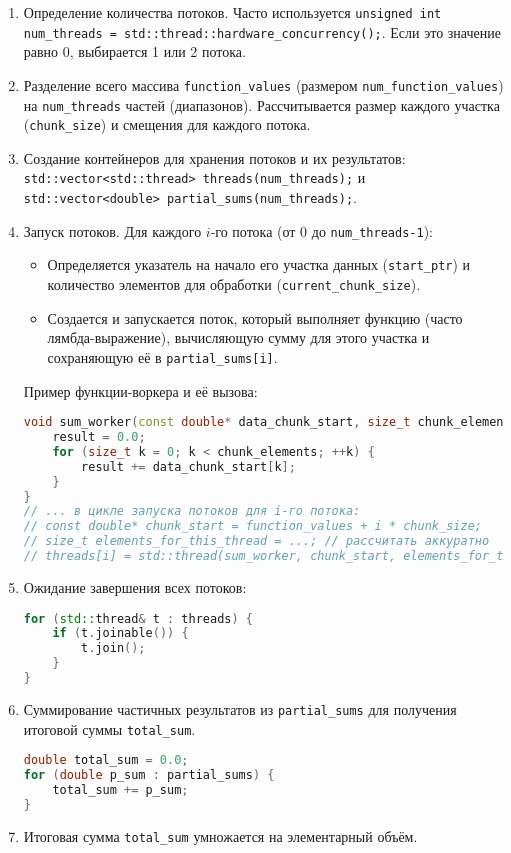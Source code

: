 \documentclass[12pt]{article}
\begin{document}
\begin{enumerate}
    \item Определение количества потоков. Часто используется \texttt{unsigned int num\_threads = std::thread::hardware\_concurrency();}. Если это значение равно 0, выбирается 1 или 2 потока.
    \item Разделение всего массива \texttt{function\_values} (размером \texttt{num\_function\_values}) на \texttt{num\_threads} частей (диапазонов). Рассчитывается размер каждого участка (\texttt{chunk\_size}) и смещения для каждого потока.
    \item Создание контейнеров для хранения потоков и их результатов: \texttt{std::vector<std::thread> threads(num\_threads);} и \texttt{std::vector<double> partial\_sums(num\_threads);}.
    \item Запуск потоков. Для каждого $i$-го потока (от 0 до \texttt{num\_threads-1}):
        \begin{itemize}
            \item Определяется указатель на начало его участка данных (\texttt{start\_ptr}) и количество элементов для обработки (\texttt{current\_chunk\_size}).
            \item Создается и запускается поток, который выполняет функцию (часто лямбда-выражение), вычисляющую сумму для этого участка и сохраняющую её в \texttt{partial\_sums[i]}.
        \end{itemize}
    Пример функции-воркера и её вызова:
\begin{lstlisting}[language=C++, basicstyle=\small\ttfamily, frame=none, numbers=none]
void sum_worker(const double* data_chunk_start, size_t chunk_elements, double& result) {
    result = 0.0;
    for (size_t k = 0; k < chunk_elements; ++k) {
        result += data_chunk_start[k];
    }
}
// ... в цикле запуска потоков для i-го потока:
// const double* chunk_start = function_values + i * chunk_size;
// size_t elements_for_this_thread = ...; // рассчитать аккуратно
// threads[i] = std::thread(sum_worker, chunk_start, elements_for_this_thread, std::ref(partial_sums[i]));
\end{lstlisting}
    \item Ожидание завершения всех потоков:
\begin{lstlisting}[language=C++, basicstyle=\small\ttfamily, frame=none, numbers=none]
for (std::thread& t : threads) {
    if (t.joinable()) {
        t.join();
    }
}
\end{lstlisting}
    \item Суммирование частичных результатов из \texttt{partial\_sums} для получения итоговой суммы \texttt{total\_sum}.
\begin{lstlisting}[language=C++, basicstyle=\small\ttfamily, frame=none, numbers=none]
double total_sum = 0.0;
for (double p_sum : partial_sums) {
    total_sum += p_sum;
}
\end{lstlisting}
    \item Итоговая сумма \texttt{total\_sum} умножается на элементарный объём.
\end{enumerate}
\end{document}
